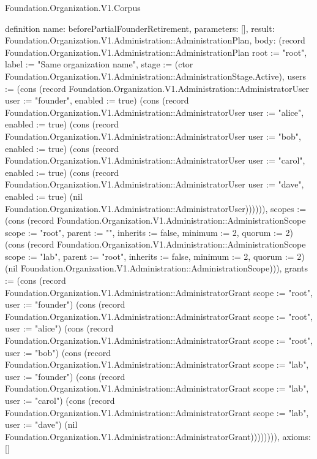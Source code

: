 \begin{lexlean}{Foundation.Organization.V1.Corpus}
\begin{semanticmodule}
definition{
  name: beforePartialFounderRetirement,
  parameters: [],
  result: Foundation.Organization.V1.Administration::AdministrationPlan,
  body: (record Foundation.Organization.V1.Administration::AdministrationPlan {root := "root", label := "Same organization name", stage := (ctor Foundation.Organization.V1.Administration::AdministrationStage.Active), users := (cons (record Foundation.Organization.V1.Administration::AdministratorUser {user := "founder", enabled := true}) (cons (record Foundation.Organization.V1.Administration::AdministratorUser {user := "alice", enabled := true}) (cons (record Foundation.Organization.V1.Administration::AdministratorUser {user := "bob", enabled := true}) (cons (record Foundation.Organization.V1.Administration::AdministratorUser {user := "carol", enabled := true}) (cons (record Foundation.Organization.V1.Administration::AdministratorUser {user := "dave", enabled := true}) (nil Foundation.Organization.V1.Administration::AdministratorUser)))))), scopes := (cons (record Foundation.Organization.V1.Administration::AdministrationScope {scope := "root", parent := "", inherits := false, minimum := 2, quorum := 2}) (cons (record Foundation.Organization.V1.Administration::AdministrationScope {scope := "lab", parent := "root", inherits := false, minimum := 2, quorum := 2}) (nil Foundation.Organization.V1.Administration::AdministrationScope))), grants := (cons (record Foundation.Organization.V1.Administration::AdministratorGrant {scope := "root", user := "founder"}) (cons (record Foundation.Organization.V1.Administration::AdministratorGrant {scope := "root", user := "alice"}) (cons (record Foundation.Organization.V1.Administration::AdministratorGrant {scope := "root", user := "bob"}) (cons (record Foundation.Organization.V1.Administration::AdministratorGrant {scope := "lab", user := "founder"}) (cons (record Foundation.Organization.V1.Administration::AdministratorGrant {scope := "lab", user := "carol"}) (cons (record Foundation.Organization.V1.Administration::AdministratorGrant {scope := "lab", user := "dave"}) (nil Foundation.Organization.V1.Administration::AdministratorGrant)))))))}),
  axioms: []
}


\end{semanticmodule}
\end{lexlean}
